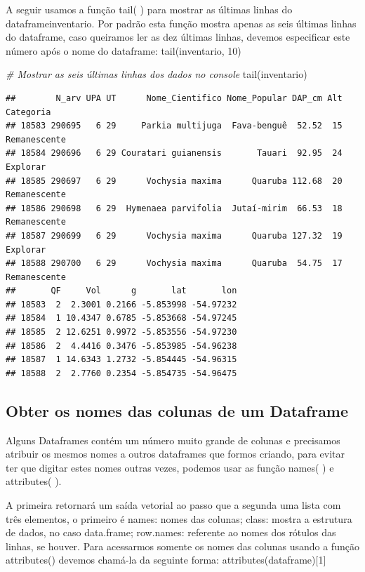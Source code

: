 \documentclass[
]{article}
\newenvironment{Shaded}{\begin{snugshade}}{\end{snugshade}}
\newcommand{\CommentTok}[1]{\textcolor[rgb]{0.56,0.35,0.01}{\textit{#1}}}
\newcommand{\FunctionTok}[1]{\textcolor[rgb]{0.00,0.00,0.00}{#1}}
\newcommand{\NormalTok}[1]{#1}
\begin{document}
A seguir usamos a função tail( ) para mostrar as últimas linhas do
dataframeinventario. Por padrão esta função mostra apenas as seis
últimas linhas do dataframe, caso queiramos ler as dez últimas linhas,
devemos especificar este número após o nome do dataframe:
tail(inventario, 10)

\begin{Shaded}
\begin{Highlighting}[]
\CommentTok{\# Mostrar as seis últimas linhas dos dados no console}
\FunctionTok{tail}\NormalTok{(inventario)}
\end{Highlighting}
\end{Shaded}

\begin{verbatim}
##        N_arv UPA UT      Nome_Cientifico Nome_Popular DAP_cm Alt    Categoria
## 18583 290695   6 29     Parkia multijuga  Fava-benguê  52.52  15 Remanescente
## 18584 290696   6 29 Couratari guianensis       Tauari  92.95  24     Explorar
## 18585 290697   6 29      Vochysia maxima      Quaruba 112.68  20 Remanescente
## 18586 290698   6 29  Hymenaea parvifolia  Jutaí-mirim  66.53  18 Remanescente
## 18587 290699   6 29      Vochysia maxima      Quaruba 127.32  19     Explorar
## 18588 290700   6 29      Vochysia maxima      Quaruba  54.75  17 Remanescente
##       QF     Vol      g       lat       lon
## 18583  2  2.3001 0.2166 -5.853998 -54.97232
## 18584  1 10.4347 0.6785 -5.853668 -54.97245
## 18585  2 12.6251 0.9972 -5.853556 -54.97230
## 18586  2  4.4416 0.3476 -5.853985 -54.96238
## 18587  1 14.6343 1.2732 -5.854445 -54.96315
## 18588  2  2.7760 0.2354 -5.854735 -54.96475
\end{verbatim}

\hypertarget{obter-os-nomes-das-colunas-de-um-dataframe}{%
\subsection{Obter os nomes das colunas de um
Dataframe}\label{obter-os-nomes-das-colunas-de-um-dataframe}}

Alguns Dataframes contém um número muito grande de colunas e precisamos
atribuir os mesmos nomes a outros dataframes que formos criando, para
evitar ter que digitar estes nomes outras vezes, podemos usar as função
names( ) e attributes( ).

A primeira retornará um saída vetorial ao passo que a segunda uma lista
com três elementos, o primeiro é names: nomes das colunas; class: mostra
a estrutura de dados, no caso data.frame; row.names: referente ao nomes
dos rótulos das linhas, se houver. Para acessarmos somente os nomes das
colunas usando a função attributes() devemos chamá-la da seguinte forma:
attributes(dataframe){[}1{]}
\end{document}

